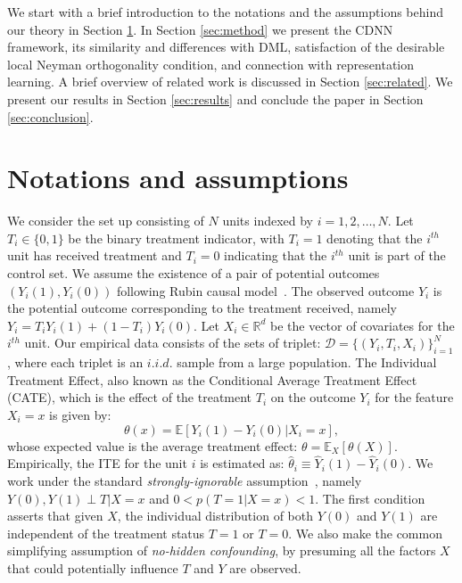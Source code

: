 \documentclass[sigconf]{acmart}
\newcommand{\eat}[1]{}
\theoremstyle{plain}
\numberwithin{equation}{section}
\begin{document}
We start with a brief introduction to the notations and the assumptions behind our theory in Section \ref{sec:notations}. In Section \ref{sec:method} we present the CDNN framework, its similarity and differences with DML, satisfaction of the desirable local Neyman orthogonality condition, and connection with representation learning. A brief overview of related work is discussed in Section \ref{sec:related}. We present our results in Section \ref{sec:results} and conclude the paper in Section \ref{sec:conclusion}.


\section{Notations and assumptions} 
\label{sec:notations}
We consider the set up consisting of $N$ units indexed by $i = 1,2,\ldots, N$. Let $T_i \in \{0,1\}$ be the binary treatment indicator, with $T_i=1$ denoting that the $i^{th}$ unit has received treatment and $T_i=0$ indicating that the $i^{th}$ unit is part of the control set. We assume the existence of a pair of potential outcomes $(Y_i(1), Y_i(0))$  following Rubin causal model~\cite{potentialOutcome}. The observed outcome $Y_i$ is the potential outcome corresponding to the treatment received, namely $Y_i = T_i Y_i(1)+(1-T_i)Y_i(0)$. Let $X_i \in \mathbb{R}^d$ be the vector of covariates for the $i^{th}$ unit. Our empirical data consists of the sets of triplet: $\mathcal{D} = \{\left(Y_i, T_i, X_i\right)\}_{i=1}^N$, where each triplet is an $i.i.d.$ sample from a large population. The Individual Treatment Effect, also known as the Conditional Average Treatment Effect (CATE), which is the effect of the treatment $T_i$ on the outcome $Y_i$ for the feature $X_i=x$ is given by:
\begin{equation}
\label{eq:conditionalAverageTreatmentEffect}
\theta(x) = \mathbb{E}[Y_i(1) - Y_i(0)| X_i=x],
\end{equation}
whose expected value is the average treatment effect: $\theta = \mathbb{E}_{X}[\theta(X)]$. Empirically, the ITE for the unit $i$ is estimated as: $\hat{\theta}_i \equiv \hat{Y}_i(1) - \hat{Y}_i(0)$. We work under the standard \emph{strongly-ignorable} assumption~\cite{rubin1983}, namely $Y(0), Y(1) \perp T | X=x$ and  $0 < p(T=1|X=x) < 1$. The first condition asserts that  given $X$, the individual distribution of both $Y(0)$ and $Y(1)$ are independent of the treatment status $T=1$ or $T=0$. We also make the common simplifying assumption of \emph{no-hidden confounding}, by presuming all the factors $X$ that could potentially influence $T$ and $Y$ are observed. 
\eat{
In traditional causal models, researchers relied on linear models that assumed $f(.,x)$ to be a weighted linear combination of covariates $x$, i.e. $\mathbb{E}\left[Y(T) | x\right]  =  \alpha + \langle x , \bm{\beta}_T\rangle$. In order to mitigate the ill-effects of strong linear assumption, more sophisticated models like propensity score matching \cite{propensity1} was introduced prior to training linear models.  This enabled better causal estimation within each propensity bin that is composed of treatment and control units with similar propensity scores. Our approach explained in the subsequent section completes eliminates the need for any explicit propensity matching.
}
\end{document}
